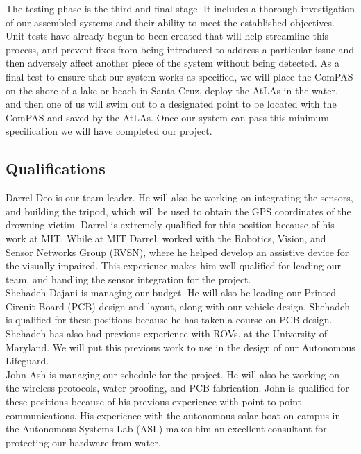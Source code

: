 \documentclass[11pt]{article}
\begin{document}
The testing phase is the third and final stage. It includes a thorough investigation of our assembled systems and their ability to meet the established objectives. Unit tests have already begun to been created that will help streamline this process, and prevent fixes from being introduced to address a particular issue and then adversely affect another piece of the system without being detected.  As a final test to ensure that our system works as specified, we will place the ComPAS on the shore of a lake or beach in Santa Cruz, deploy the AtLAs in the water, and then one of us will swim out to a designated point to be located with the ComPAS and saved by the AtLAs. Once our system can pass this minimum specification we will have completed our project.

\subsection*{Qualifications}

Darrel Deo is our team leader. He will also be working on integrating the sensors, and building the tripod, which will be used to obtain the GPS coordinates of the drowning victim. Darrel is extremely qualified for this position because of his work at MIT. While at MIT Darrel, worked with the Robotics, Vision, and Sensor Networks Group (RVSN),  where he helped develop an assistive device for the visually impaired. This experience makes him well qualified for leading our team, and handling the sensor integration for the project.\\

Shehadeh Dajani is managing our budget. He will also be leading our Printed Circuit Board (PCB) design and layout, along with our vehicle design. Shehadeh is qualified for these positions because he has taken a course on PCB design. Shehadeh has also had previous experience with ROVs, at the University of Maryland. We will put this previous work to use in the design of our Autonomous Lifeguard.\\

John Ash is managing our schedule for the project. He will also be working on the wireless protocols, water proofing, and PCB fabrication. John is qualified for these positions because of his previous experience with point-to-point communications. His experience with the autonomous solar boat on campus in the Autonomous Systems Lab (ASL) makes him an excellent consultant for protecting our hardware from water. \\
\end{document}

